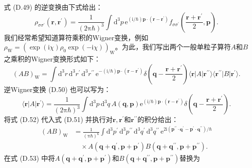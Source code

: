 式 (D.49) 的逆变换由下式给出：
\begin{equation}
\rho_{\sigma\sigma^{\prime}}(\boldsymbol{r},\boldsymbol{r}^{\prime})=\frac{1}{(2\mathrm{\pi}\hbar)^{3}}\int\mathrm{d}^{3}p\,\mathrm{e}^{(\mathrm{i}/\hbar)\boldsymbol{p}\cdot(\boldsymbol{r}-\boldsymbol{r}^{\prime})}f_{\sigma\sigma^{\prime}}\left(\frac{\boldsymbol{r}+\boldsymbol{r}^{\prime}}{2},\boldsymbol{p}\right).\label{eq:appendix_d_wigner_inverse}
\end{equation}
我们经常希望知道算符乘积的Wigner变换，例如$\rho_{\text{W}}=(\exp(\mathrm{i}\chi)\rho_{0}\exp(-\mathrm{i}\chi))_{\text{W}}$。为此，我们写出两个一般单粒子算符$A$和$B$之乘积的Wigner变换形式如下：
\begin{equation}
(AB)_{\text{W}}=\int\mathrm{d}^{3}r\,\mathrm{d}^{3}r^{\prime}\,\mathrm{d}^{3}r^{\prime\prime}\,\mathrm{e}^{-(\mathrm{i}/\hbar)\boldsymbol{p}\cdot(\boldsymbol{r}-\boldsymbol{r}^{\prime})}\delta\left(\boldsymbol{q}-\frac{\boldsymbol{r}+\boldsymbol{r}^{\prime}}{2}\right)\langle\boldsymbol{r}|A|\boldsymbol{r}^{\prime\prime}\rangle\langle\boldsymbol{r}^{\prime\prime}|B|\boldsymbol{r}^{\prime}\rangle.\label{eq:appendix_d_ab_wigner}
\end{equation}
逆Wigner变换 (D.50) 也可以写为：
\begin{equation}
\langle\boldsymbol{r}|A|\boldsymbol{r}^{\prime}\rangle=\frac{1}{(2\mathrm{\pi}\hbar)^{3}}\int\mathrm{d}^{3}p\,\mathrm{d}^{3}q\,A(\boldsymbol{q},\boldsymbol{p})\mathrm{e}^{(\mathrm{i}/\hbar)\boldsymbol{p}\cdot(\boldsymbol{r}-\boldsymbol{r}^{\prime})}\delta\left(\boldsymbol{q}-\frac{\boldsymbol{r}+\boldsymbol{r}^{\prime}}{2}\right).\label{eq:appendix_d_inverse_wigner_a}
\end{equation}
将式 (D.52) 代入式 (D.51) 并执行对$\boldsymbol{r},\boldsymbol{r}^{\prime}$和$\boldsymbol{r}^{\prime\prime}$的积分给出：
\begin{align}
(AB)_{\text{W}} & =\frac{1}{(\mathrm{\pi}\hbar)^{6}}\int\mathrm{d}^{3}p^{\prime}\,\mathrm{d}^{3}p^{\prime\prime}\,\mathrm{d}^{3}q^{\prime}\,\mathrm{d}^{3}q^{\prime\prime}\,\mathrm{e}^{2\mathrm{i}(\boldsymbol{p}^{\prime\prime}\cdot\boldsymbol{q}^{\prime}-\boldsymbol{p}^{\prime}\cdot\boldsymbol{q}^{\prime\prime})/\hbar}\nonumber \\
 & \quad\times A(\boldsymbol{q}+\boldsymbol{q}^{\prime},\boldsymbol{p}+\boldsymbol{p}^{\prime})B(\boldsymbol{q}+\boldsymbol{q}^{\prime\prime},\boldsymbol{p}+\boldsymbol{p}^{\prime\prime}).\label{eq:appendix_d_ab_wigner_integral}
\end{align}
在式 (D.53) 中将$A(\boldsymbol{q}+\boldsymbol{q}^{\prime},\boldsymbol{p}+\boldsymbol{p}^{\prime})$和$B(\boldsymbol{q}+\boldsymbol{q}^{\prime\prime},\boldsymbol{p}+\boldsymbol{p}^{\prime\prime})$替换为
